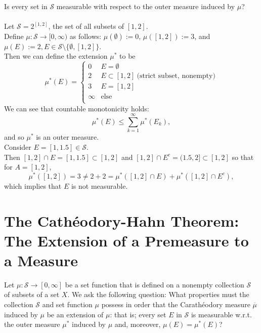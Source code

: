 \begin{enumerate}
	Is every set in $\mathcal{S}$ measurable with respect to the outer measure induced by $\mu$?\\
	\\Let $\mathcal{S}=2^{[1,2]}$, the set of all subsets of $[1,2]$.
	\\Define $\mu:\mathcal{S}\to[0,\infty)$ as follows: $\mu(\emptyset):=0$, $\mu([1,2]):=3$, and $\mu(E):=2,E\in\mathcal{S}\setminus\{\emptyset,[1,2]\}$. 
	\\Then we can define the extension $\mu^*$ to be
	\[
		\mu^*(E)=
		\begin{cases}
			0&E=\emptyset\\
			2&E\subset[1,2]\ \text{(strict subset, nonempty)}\\
			3&E=[1,2]\\
			\infty&\text{else}\\
		\end{cases}
	\]
	We can see that countable monotonicity holds:
	\[
		\mu^*(E)\le\sum_{k=1}^\infty\mu^*(E_k),
	\]
	and so $\mu^*$ is an outer measure.
	\\Consider $E=[1,1.5]\in\mathcal{S}$.
	\\Then $[1,2]\cap E=[1,1.5]\subset[1,2]$ and $[1,2]\cap E^c=(1.5,2]\subset[1,2]$ so that for $A=[1,2]$,
	\[
		\mu^*([1,2])=3\neq2+2=\mu^*([1,2]\cap E)+\mu^*([1,2]\cap E^c),
	\]
	which implies that $E$ is not measurable.
\end{enumerate}

\section{The Cath\'eodory-Hahn Theorem: The Extension of a Premeasure to a Measure}
Let $\mu:\mathcal{S}\to[0,\infty]$ be a set function that is defined on a nonempty collection $\mathcal{S}$ of subsets of a set $X$.
We ask the following question:
What properties must the collection $\mathcal{S}$ and set function $\mu$ possess in order that the Carath\'eodory measure $\overline{\mu}$ induced by $\mu$ be an extension of $\mu$:
that is; every set $E$ in $\mathcal{S}$ is measurable w.r.t. the outer measure $\mu^*$ induced by $\mu$ and, moreover, $\mu(E)=\mu^*(E)$?

